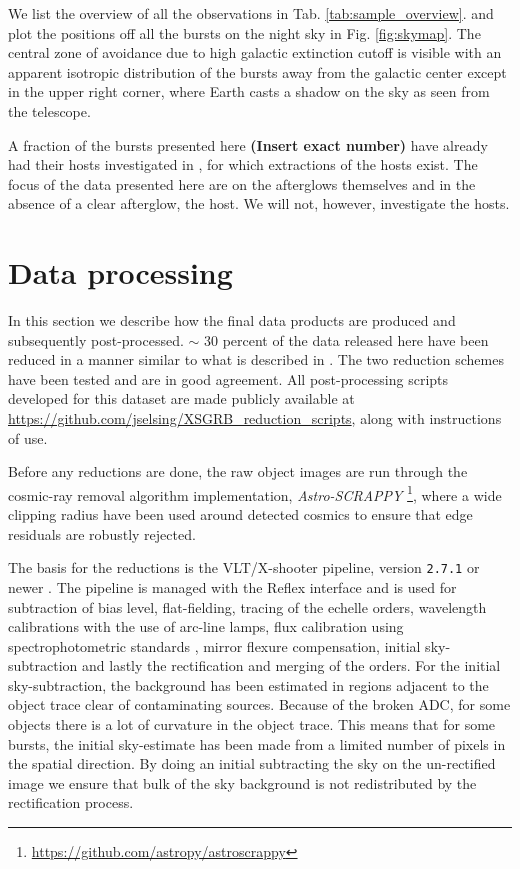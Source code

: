 \documentclass{aa}    %
\newcommand\todo[1]{\textbf{(#1)}}
\begin{document}
We list the overview of all the observations in Tab. \ref{tab:sample_overview}.
 and plot the positions off all the bursts on
the night sky in Fig. \ref{fig:skymap}. The central zone of avoidance due to
high galactic extinction cutoff is visible with an apparent isotropic
distribution of the bursts away from the galactic center except in the upper
right corner, where Earth casts a shadow on the sky as seen from the telescope.


A fraction of the bursts presented here \todo{Insert exact
number} have already had their hosts investigated in \citet{Kruhler2015}, for
which extractions of the hosts exist. The focus of the data presented here are
on the afterglows themselves and in the absence of a clear afterglow, the host.
We will not, however, investigate the hosts.





\section{Data processing}

In this section we describe how the final data products are produced and
subsequently post-processed. $\sim$ 30 percent of the data released here have
been reduced in a manner similar to what is described in \citet{Kruhler2015}.
The two reduction schemes have been tested and are in good agreement. All
post-processing scripts developed for this dataset are made publicly available
at \url{https://github.com/jselsing/XSGRB_reduction_scripts}, along with
instructions of use.

Before any reductions are done, the raw object images are run through the
cosmic-ray removal algorithm \citep{VanDokkum2001} implementation,
\textit{Astro-SCRAPPY} \footnote{\url{https://github.com/astropy/astroscrappy}},
where a wide clipping radius have been used around detected cosmics to ensure that edge residuals are
robustly rejected. 

The basis for the reductions is the VLT/X-shooter pipeline, version
\texttt{2.7.1} or newer \citep{Goldoni2006, Modigliani2010}. The pipeline is
managed with the Reflex interface \citep{Freudling2013} and is used for
subtraction of bias level, flat-fielding, tracing of the echelle orders,
wavelength calibrations with the use of arc-line lamps, flux calibration using
spectrophotometric standards \citep{Vernet2010, Hamuy1994}, mirror flexure
compensation, initial sky-subtraction and lastly the rectification and merging
of the orders. For the initial sky-subtraction, the background has been
estimated in regions adjacent to the object trace clear of contaminating
sources. Because of the broken ADC, for some objects there is a lot of curvature
in the object trace. This means that for some bursts, the initial sky-estimate
has been made from a limited number of pixels in the spatial direction. By doing
an initial subtracting the sky on the un-rectified image we ensure that bulk of
the sky background is not redistributed by the rectification process.
\end{document}
